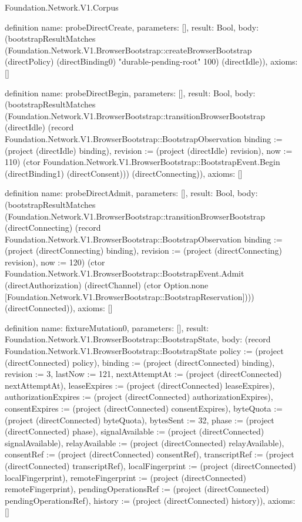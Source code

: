 \begin{lexlean}{Foundation.Network.V1.Corpus}
\begin{semanticmodule}
definition{
  name: probeDirectCreate,
  parameters: [],
  result: Bool,
  body: (bootstrapResultMatches (Foundation.Network.V1.BrowserBootstrap::createBrowserBootstrap (directPolicy) (directBinding0) "durable-pending-root" 100) (directIdle)),
  axioms: []
}

definition{
  name: probeDirectBegin,
  parameters: [],
  result: Bool,
  body: (bootstrapResultMatches (Foundation.Network.V1.BrowserBootstrap::transitionBrowserBootstrap (directIdle) (record Foundation.Network.V1.BrowserBootstrap::BootstrapObservation {binding := (project (directIdle) binding), revision := (project (directIdle) revision), now := 110}) (ctor Foundation.Network.V1.BrowserBootstrap::BootstrapEvent.Begin (directBinding1) (directConsent))) (directConnecting)),
  axioms: []
}

definition{
  name: probeDirectAdmit,
  parameters: [],
  result: Bool,
  body: (bootstrapResultMatches (Foundation.Network.V1.BrowserBootstrap::transitionBrowserBootstrap (directConnecting) (record Foundation.Network.V1.BrowserBootstrap::BootstrapObservation {binding := (project (directConnecting) binding), revision := (project (directConnecting) revision), now := 120}) (ctor Foundation.Network.V1.BrowserBootstrap::BootstrapEvent.Admit (directAuthorization) (directChannel) (ctor Option.none [Foundation.Network.V1.BrowserBootstrap::BootstrapReservation]))) (directConnected)),
  axioms: []
}

definition{
  name: fixtureMutation0,
  parameters: [],
  result: Foundation.Network.V1.BrowserBootstrap::BootstrapState,
  body: (record Foundation.Network.V1.BrowserBootstrap::BootstrapState {policy := (project (directConnected) policy), binding := (project (directConnected) binding), revision := 3, lastNow := 121, nextAttemptAt := (project (directConnected) nextAttemptAt), leaseExpires := (project (directConnected) leaseExpires), authorizationExpires := (project (directConnected) authorizationExpires), consentExpires := (project (directConnected) consentExpires), byteQuota := (project (directConnected) byteQuota), bytesSent := 32, phase := (project (directConnected) phase), signalAvailable := (project (directConnected) signalAvailable), relayAvailable := (project (directConnected) relayAvailable), consentRef := (project (directConnected) consentRef), transcriptRef := (project (directConnected) transcriptRef), localFingerprint := (project (directConnected) localFingerprint), remoteFingerprint := (project (directConnected) remoteFingerprint), pendingOperationsRef := (project (directConnected) pendingOperationsRef), history := (project (directConnected) history)}),
  axioms: []
}


\end{semanticmodule}
\end{lexlean}
